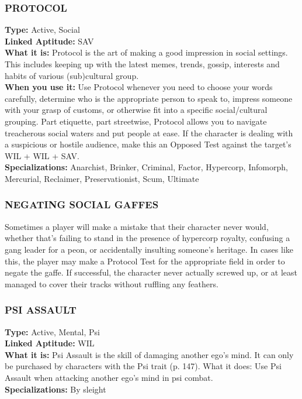 \subsubsection{PROTOCOL} \textbf{Type:} Active, Social \\ \textbf{Linked Aptitude:} SAV \\ \textbf{What it is:} Protocol is the art of making a good impression in social settings. This includes keeping up with the latest memes, trends, gossip, interests and habits of various (sub)cultural group. \\ \textbf{When you use it:} Use Protocol whenever you need to choose your words carefully, determine who is the appropriate person to speak to, impress someone with your grasp of customs, or otherwise fit into a specific social/cultural grouping. Part etiquette, part streetwise, Protocol allows you to navigate treacherous social waters and put people at ease. If the character is dealing with a suspicious or hostile audience, make this an Opposed Test against the target’s WIL + WIL + SAV. \\ \textbf{Specializations:} Anarchist, Brinker, Criminal, Factor, Hypercorp, Infomorph, Mercurial, Reclaimer, Preservationist, Scum, Ultimate 

\subsubsection{NEGATING SOCIAL GAFFES} Sometimes a player will make a mistake that their character never would, whether that’s failing to stand in the presence of hypercorp royalty, confusing a gang leader for a peon, or accidentally insulting someone’s heritage. In cases like this, the player may make a Protocol Test for the appropriate field in order to negate the gaffe. If successful, the character never actually screwed up, or at least managed to cover their tracks without ruffling any feathers. 



\subsubsection{PSI ASSAULT} \textbf{Type:} Active, Mental, Psi \\ \textbf{Linked Aptitude:} WIL \\ \textbf{What it is:} Psi Assault is the skill of damaging another ego’s mind. It can only be purchased by characters with the Psi trait (p. 147). What it does: Use Psi Assault when attacking another ego’s mind in psi combat. \\ \textbf{Specializations:} By sleight 

